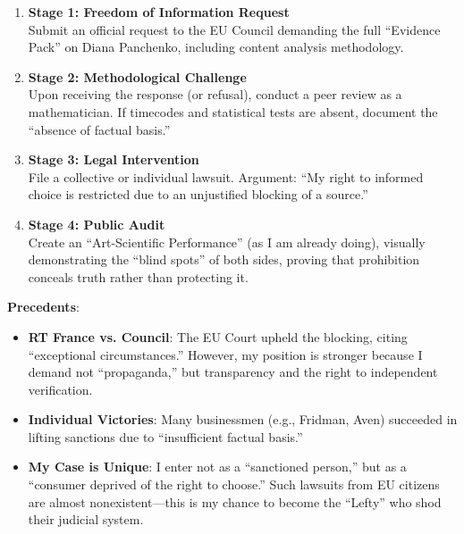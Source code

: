 \documentclass[11pt,a4paper]{article}
\theoremstyle{definition}
\theoremstyle{remark}
\begin{document}
\begin{enumerate}
\item \textbf{Stage 1: Freedom of Information Request} \\
Submit an official request to the EU Council demanding the full ``Evidence Pack'' on Diana Panchenko, including content analysis methodology.

\item \textbf{Stage 2: Methodological Challenge} \\
Upon receiving the response (or refusal), conduct a peer review as a mathematician. If timecodes and statistical tests are absent, document the ``absence of factual basis.''

\item \textbf{Stage 3: Legal Intervention} \\
File a collective or individual lawsuit. Argument: ``My right to informed choice is restricted due to an unjustified blocking of a source.''

\item \textbf{Stage 4: Public Audit} \\
Create an ``Art-Scientific Performance'' (as I am already doing), visually demonstrating the ``blind spots'' of both sides, proving that prohibition conceals truth rather than protecting it.
\end{enumerate}

\textbf{Precedents}:
\begin{itemize}
\item \textbf{RT France vs. Council}: The EU Court upheld the blocking, citing ``exceptional circumstances.'' However, my position is stronger because I demand not ``propaganda,'' but transparency and the right to independent verification.
\item \textbf{Individual Victories}: Many businessmen (e.g., Fridman, Aven) succeeded in lifting sanctions due to ``insufficient factual basis.''
\item \textbf{My Case is Unique}: I enter not as a ``sanctioned person,'' but as a ``consumer deprived of the right to choose.'' Such lawsuits from EU citizens are almost nonexistent—this is my chance to become the ``Lefty'' who shod their judicial system.
\end{itemize}
\end{document}
